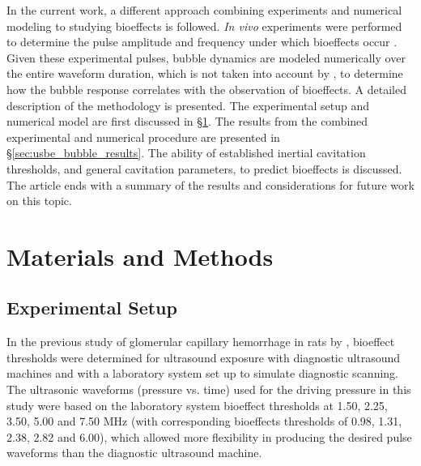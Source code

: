 In the current work, a different approach combining experiments and
numerical modeling to studying bioeffects is followed.  \emph{In vivo}
experiments were performed to determine the pulse amplitude and
frequency under which bioeffects occur \cite[]{Miller2008b}.  Given
these experimental pulses, bubble dynamics are modeled numerically
over the entire waveform duration, which is not taken into account by
\cite{apfel1991}, to determine how the bubble response correlates with
the observation of bioeffects.  A detailed description of the
methodology is presented. The experimental setup and numerical model
are first discussed in \S \ref{sec:usbe_bubble_methods}. The results
from the combined experimental and numerical procedure are presented
in \S \ref{sec:usbe_bubble_results}. The ability of established
inertial cavitation thresholds, and general cavitation parameters, to
predict bioeffects is discussed. The article ends with a summary of
the results and considerations for future work on this topic.

\section{Materials and Methods}
\label{sec:usbe_bubble_methods}
\subsection{Experimental Setup}

In the previous study of glomerular capillary hemorrhage in rats by
\cite{Miller2008b}, bioeffect thresholds were determined for
ultrasound exposure with diagnostic ultrasound machines and with a
laboratory system set up to simulate diagnostic scanning.  The
ultrasonic waveforms (pressure vs. time) used for the driving pressure
in this study were based on the laboratory system bioeffect thresholds
at 1.50, 2.25, 3.50, 5.00 and 7.50 MHz (with corresponding bioeffects
thresholds of 0.98, 1.31, 2.38, 2.82 and 6.00), which allowed more
flexibility in producing the desired pulse waveforms than the
diagnostic ultrasound machine.

